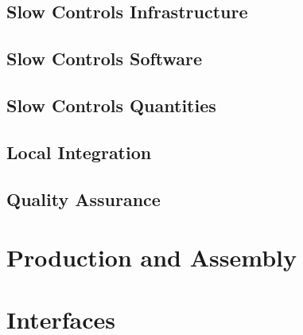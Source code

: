 \subsection{Slow Controls Infrastructure}
\label{sec:fdsp-slow-cryo-slow-infra}

\subsection{Slow Controls Software}
\label{sec:fdsp-slow-cryo-sw}

\subsection{Slow Controls Quantities}
\label{sec:fdsp-slow-cryo-quant}

\subsection{Local Integration}
\label{sec:fdsp-slow-cryo-slow-loc-integ}

\subsection{Quality Assurance}
\label{sec:fdsp-slow-cryo-slow-qa}



\section{Production and Assembly}
\label{sec:fdsp-slow-cryo-prod-assy}




\section{Interfaces}
\label{sec:fdsp-slow-cryo-intfc}





